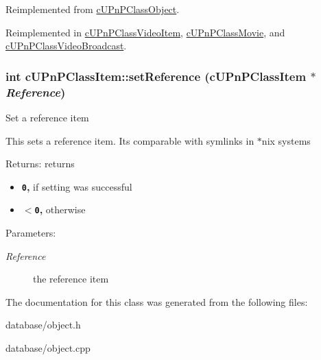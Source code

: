 Reimplemented from \hyperlink{classcUPnPClassObject_6f2a803a0d0e148133edce23ed6c0e7c}{cUPnPClassObject}.

Reimplemented in \hyperlink{classcUPnPClassVideoItem_3cbda6d87f5a9ff0475a75e76ba19924}{cUPnPClassVideoItem}, \hyperlink{classcUPnPClassMovie_d7f990edda85f2caabe822d2ceeb2b0d}{cUPnPClassMovie}, and \hyperlink{classcUPnPClassVideoBroadcast_ce7a341834e448479d3c8f4f0254ce43}{cUPnPClassVideoBroadcast}.\hypertarget{classcUPnPClassItem_79153d8d7b4ac30af0af0146d69c8e83}{
\subsubsection[{setReference}]{\setlength{\rightskip}{0pt plus 5cm}int cUPnPClassItem::setReference ({\bf cUPnPClassItem} $\ast$ {\em Reference})}}
\label{classcUPnPClassItem_79153d8d7b4ac30af0af0146d69c8e83}


Set a reference item

This sets a reference item. Its comparable with symlinks in $\ast$nix systems \begin{Desc}
\item[Returns:]returns\begin{itemize}
\item {\bf {\tt 0},} if setting was successful\item {\bf {\tt $<$0},} otherwise \end{itemize}
\end{Desc}
\begin{Desc}
\item[Parameters:]
\begin{description}
\item[{\em Reference}]the reference item \end{description}
\end{Desc}


The documentation for this class was generated from the following files:\begin{CompactItemize}
\item 
database/object.h\item 
database/object.cpp\end{CompactItemize}
